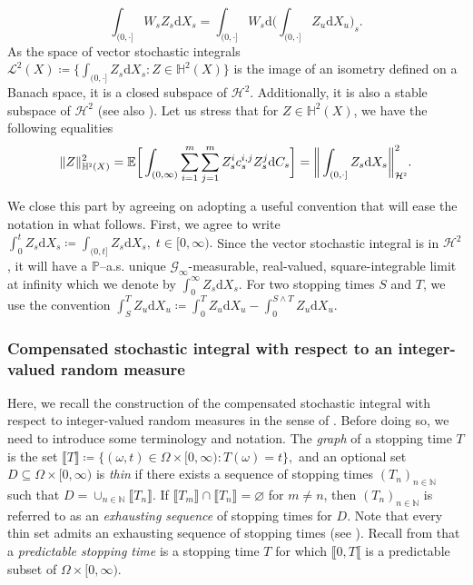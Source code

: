 \documentclass[10pt]{article} %
\newcommand\cG{\mathcal G}
\newcommand\cH{\mathcal H}
\newcommand\cL{\mathcal L}
\newcommand{\smalltext}[1]{\text{\fontsize{4}{4}\selectfont$#1$}}
\def \E{\mathbb{E}}
\def \H{\mathbb{H}}
\def \N{\mathbb{N}}
\def \P{\mathbb{P}}
\newcommand{\1}{\mathbf{1}}
\def\d{\mathrm{d}}
\begin{document}
		\begin{equation*}
			\int_{(0,\cdot]} W_sZ_s \d X_s = \int_{(0,\cdot]} W_s \d \bigg( \int_{(0,\cdot]} Z_u \d X_u \bigg)_s.
		\end{equation*}
As the space of vector stochastic integrals $\cL^2(X) \coloneqq \big\{ \int_{(0,\cdot]} Z_s \d X_s : Z \in \H^2(X) \big\}$ is the image of an isometry defined on a Banach space, it is a closed subspace of $\cH^2$. Additionally, it is also a stable subspace of $\cH^2$ (see also \cite[Definition 4.4 and Theorem 4.35]{jacod1979calcul}). Let us stress that for $Z \in \H^2(X)$, we have the following equalities
\begin{equation*}
	\|Z\|^2_{\H^\smalltext{2}(X)} = \E \bigg[ \int_{(0,\infty)}  \sum_{i=1}^m\sum_{j=1}^m Z^i_s c^{i,j}_s Z^j_s  \d C_s \bigg] = \bigg\| \int_{(0,\cdot]} Z_s \d X_s \bigg\|^2_{\cH^\smalltext{2}}.
\end{equation*}

We close this part by agreeing on adopting a useful convention that will ease the notation in what follows. First, we agree to write $\int_0^t Z_s \d X_s \coloneqq \int_{(0,t]} Z_s \d X_s, \; t \in [0,\infty).$ Since the vector stochastic integral is in $\cH^2$, it will have a $\P$--a.s. unique $\cG_\infty$-measurable, real-valued, square-integrable limit at infinity which we denote by $
 	\int_0^\infty Z_s \d X_s.$ For two stopping times $S$ and $T$, we use the convention $\int_S^T Z_u \d X_u \coloneqq \int_0^T Z_u \d X_u - \int_0^{S\land T} Z_u \d X_u.$

\subsubsection{Compensated stochastic integral with respect to an integer-valued random measure}\label{sec::compensated_si}

Here, we recall the construction of the compensated stochastic integral with respect to integer-valued random measures in the sense of \cite{cohen2015stochastic,jacod1979calcul,jacod2003limit}. Before doing so, we need to introduce some terminology and notation. The \emph{graph} of a stopping time $T$ is the set $\llbracket T \rrbracket \coloneqq \{(\omega,t) \in \Omega \times [0,\infty): T(\omega)= t\},$ and an optional set $D \subseteq \Omega \times [0,\infty)$ is \emph{thin} if there exists a sequence of stopping times $(T_n)_{n \in \N}$ such that $D = \cup_{n \in \N} \llbracket T_n \rrbracket.$ If $\llbracket T_m \rrbracket \cap \llbracket T_n \rrbracket = \varnothing$ for $m \neq n$, then $(T_n)_{n \in \N}$ is referred to as an \emph{exhausting sequence} of stopping times for $D$. Note that every thin set admits an exhausting sequence of stopping times (see \cite[Lemma I.1.31]{jacod2003limit}). Recall from  that a \emph{predictable stopping time} is a stopping time $T$ for which $\llbracket 0,T\llbracket$ is a predictable subset of $\Omega \times [0,\infty)$.
\end{document}

